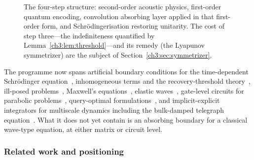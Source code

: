 \begin{figure}[tb]
  \centering
  \caption{The four-step structure: second-order acoustic physics,
  first-order quantum encoding, convolution absorbing layer applied in
  that first-order form, and Schr\"odingerisation restoring unitarity.
  The cost of step three---the indefiniteness quantified by
  Lemma~\protect\ref{ch3:lem:threshold}---and its remedy (the Lyapunov symmetrizer)
  are the subject of Section~\protect\ref{ch3:sec:symmetrizer}.}
  \label{ch3:fig:pipeline}
\end{figure}  The programme now spans artificial boundary
conditions for the time-dependent Schr\"odinger
equation~\cite{jin2024abc}, inhomogeneous terms and the recovery-threshold
theory~\cite{jin2024recovery}, ill-posed problems~\cite{jin2024illposed},
Maxwell's equations~\cite{jin2023maxwell,ma2024maxwellcircuits}, elastic
waves~\cite{jin2025elastic}, gate-level circuits for parabolic
problems~\cite{hu2024quantum,jin2024heat}, query-optimal
formulations~\cite{jin2025queries}, and implicit-explicit integrators
for multiscale dynamics including the bulk-damped telegraph
equation~\cite{hu2026imex}.  What it does not yet contain is an
absorbing boundary for a classical wave-type equation, at either matrix or
circuit level.

\subsubsection{Related work and positioning}
\label{ch3:sec:related}

